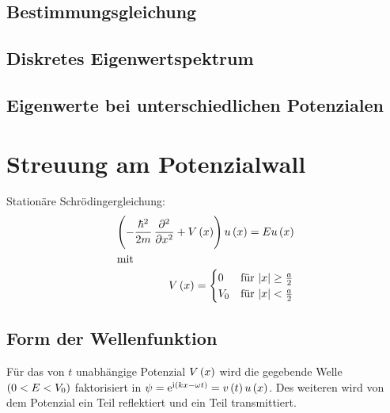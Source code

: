 \subsection{Bestimmungsgleichung}

\subsection{Diskretes Eigenwertspektrum}

\subsection{Eigenwerte bei unterschiedlichen Potenzialen}

\section{Streuung am Potenzialwall}

Stationäre Schrödingergleichung:
\begin{align*}
 \del{-\frac{\hbar^2}{2m} \dpd[2]{}{x} + V\del{x}} u\del{x} = E u\del{x}\\
 \intertext{mit}
 V\del{x} =
 \begin{cases}
  0 & \text{für } \abs{x} \geq \frac{a}{2}\\
  V_0 & \text{für } \abs{x} < \frac{a}{2}
 \end{cases}
\end{align*}


\subsection{Form der Wellenfunktion}
Für das von $t$ unabhängige Potenzial $V\del{x}$ wird die gegebende Welle $\del{0 < E < V_0}$ faktorisiert in $\psi = \ee^{\ii\del{kx-\omega t}} = v\del{t}u\del{x}$.
Des weiteren wird von dem Potenzial ein Teil reflektiert und ein Teil transmittiert.

